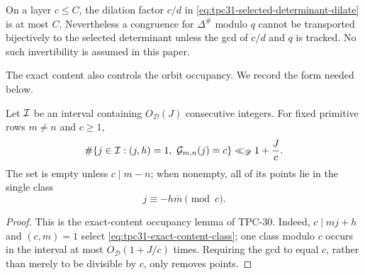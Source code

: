 \begin{remark}
\label{rem:tpc31-small-multiplier}
On a layer $c\le C$, the dilation factor $c/d$ in
\eqref{eq:tpc31-selected-determinant-dilate} is at most $C$.
Nevertheless a congruence for $\Delta^\#$ modulo $q$ cannot be
transported bijectively to the selected determinant unless the gcd of
$c/d$ and $q$ is tracked.  No such invertibility is assumed in this
paper.
\end{remark}

The exact content also controls the orbit occupancy.  We record the
form needed below.

\begin{lemma}
\label{lem:tpc31-exact-content-orbit}
Let $\mathcal I$ be an interval containing $O_{\mathscr D}(J)$ consecutive
integers.  For fixed primitive rows $m\ne n$ and $c\ge1$,
\begin{equation}
 \#\{j\in\mathcal I:(j,h)=1,\ \mathcal G_{m,n}(j)=c\}
 \ll_{\mathscr D}1+\frac Jc.
 \label{eq:tpc31-exact-content-orbit}
\end{equation}
The set is empty unless $c\mid m-n$; when nonempty, all of its points
lie in the single class
\begin{equation}
 j\equiv-h\overline m\pmod c.
 \label{eq:tpc31-exact-content-class}
\end{equation}
\end{lemma}

\begin{proof}
This is the exact-content occupancy lemma of TPC-30.  Indeed,
$c\mid mj+h$ and $(c,m)=1$ select
\eqref{eq:tpc31-exact-content-class}; one class modulo $c$ occurs in
the interval at most $O_{\mathscr D}(1+J/c)$ times.  Requiring the gcd
to equal $c$, rather than merely to be divisible by $c$, only removes
points.
\end{proof}
